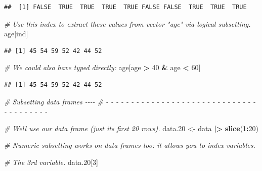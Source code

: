 \documentclass[
]{book}
\newenvironment{Shaded}{\begin{snugshade}}{\end{snugshade}}
\newcommand{\CommentTok}[1]{\textcolor[rgb]{0.56,0.35,0.01}{\textit{#1}}}
\newcommand{\DecValTok}[1]{\textcolor[rgb]{0.00,0.00,0.81}{#1}}
\newcommand{\FloatTok}[1]{\textcolor[rgb]{0.00,0.00,0.81}{#1}}
\newcommand{\FunctionTok}[1]{\textcolor[rgb]{0.13,0.29,0.53}{\textbf{#1}}}
\newcommand{\NormalTok}[1]{#1}
\newcommand{\OtherTok}[1]{\textcolor[rgb]{0.56,0.35,0.01}{#1}}
\newcommand{\SpecialCharTok}[1]{\textcolor[rgb]{0.81,0.36,0.00}{\textbf{#1}}}
\begin{document}
\begin{verbatim}
##  [1] FALSE  TRUE  TRUE  TRUE  TRUE FALSE FALSE  TRUE  TRUE  TRUE
\end{verbatim}

\begin{Shaded}
\begin{Highlighting}[]
\CommentTok{\# Use this index to extract these values from vector "age" via logical subsetting.}
\NormalTok{age[ind]}
\end{Highlighting}
\end{Shaded}

\begin{verbatim}
## [1] 45 54 59 52 42 44 52
\end{verbatim}

\begin{Shaded}
\begin{Highlighting}[]
\CommentTok{\# We could also have typed directly:}
\NormalTok{age[age }\SpecialCharTok{\textgreater{}} \DecValTok{40} \SpecialCharTok{\&}\NormalTok{ age }\SpecialCharTok{\textless{}} \DecValTok{60}\NormalTok{]}
\end{Highlighting}
\end{Shaded}

\begin{verbatim}
## [1] 45 54 59 52 42 44 52
\end{verbatim}

\begin{Shaded}
\begin{Highlighting}[]
\CommentTok{\# Subsetting data frames                                                     {-}{-}{-}{-} }
\CommentTok{\# {-} {-} {-} {-} {-} {-} {-} {-} {-} {-} {-} {-} {-} {-} {-} {-} {-} {-} {-} {-} {-} {-} {-} {-} {-} {-} {-} {-} {-} {-} {-} {-} {-} {-} {-} {-} {-} {-} {-} }

\CommentTok{\# We\textquotesingle{}ll use our data frame (just its first 20 rows).}
\NormalTok{data}\FloatTok{.20} \OtherTok{\textless{}{-}}\NormalTok{ data }\SpecialCharTok{|\textgreater{}} 
  \FunctionTok{slice}\NormalTok{(}\DecValTok{1}\SpecialCharTok{:}\DecValTok{20}\NormalTok{)}

\CommentTok{\# Numeric subsetting works on data frames too: it allows you to index variables.}

\CommentTok{\# The 3rd variable.}
\NormalTok{data}\FloatTok{.20}\NormalTok{[}\DecValTok{3}\NormalTok{]}
\end{Highlighting}
\end{Shaded}
\end{document}
